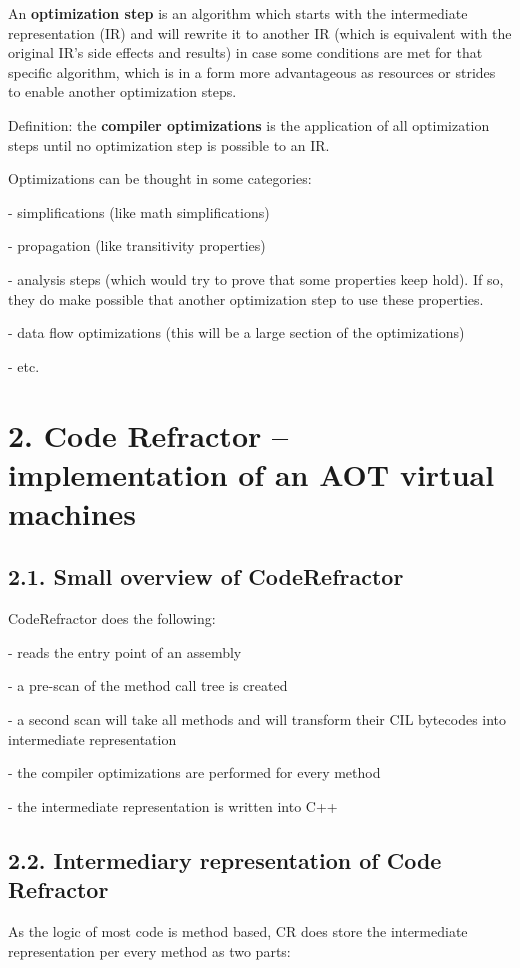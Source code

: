 \documentclass[letterpaper]{article}
\begin{document}
An \textbf{optimization step} is an algorithm which starts with the intermediate representation (IR) and will rewrite it
to another IR (which is equivalent with the original IR's side effects and results) in case some conditions are met for
that specific algorithm, which is in a form more advantageous as resources or strides to enable another optimization
steps.

Definition: the \textbf{compiler optimizations} is the application of all optimization steps until no optimization step
is possible to an IR.

Optimizations can be thought in some categories:

{}- simplifications (like math simplifications)

{}- propagation (like transitivity properties)

{}- analysis steps (which would try to prove that some properties keep hold). If so, they do make possible that another
optimization step to use these properties.

{}- data flow optimizations (this will be a large section of the optimizations)

{}- etc.


\bigskip

\clearpage\section{2. Code Refractor -- implementation of an AOT virtual machines}
\subsection{2.1. Small overview of CodeRefractor}
CodeRefractor does the following:

{}- reads the entry point of an assembly

{}- a pre-scan of the method call tree is created

{}- a second scan will take all methods and will transform their CIL bytecodes into intermediate representation

{}- the compiler optimizations are performed for every method

{}- the intermediate representation is written into C++


\bigskip

\subsection{2.2. Intermediary representation of Code Refractor}
As the logic of most code is method based, CR does store the intermediate representation per every method as two parts:
\end{document}
